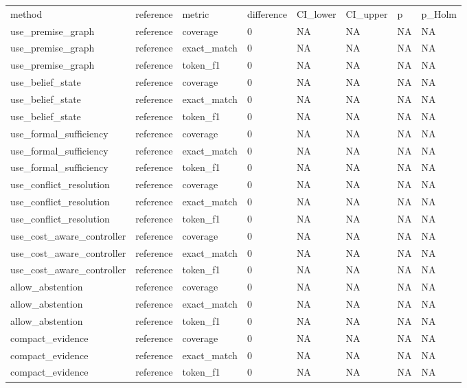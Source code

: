 \begin{tabular}{llllllll}
\hline
method & reference & metric & difference & CI\_lower & CI\_upper & p & p\_Holm \\
use\_premise\_graph & reference & coverage & 0 & NA & NA & NA & NA \\
use\_premise\_graph & reference & exact\_match & 0 & NA & NA & NA & NA \\
use\_premise\_graph & reference & token\_f1 & 0 & NA & NA & NA & NA \\
use\_belief\_state & reference & coverage & 0 & NA & NA & NA & NA \\
use\_belief\_state & reference & exact\_match & 0 & NA & NA & NA & NA \\
use\_belief\_state & reference & token\_f1 & 0 & NA & NA & NA & NA \\
use\_formal\_sufficiency & reference & coverage & 0 & NA & NA & NA & NA \\
use\_formal\_sufficiency & reference & exact\_match & 0 & NA & NA & NA & NA \\
use\_formal\_sufficiency & reference & token\_f1 & 0 & NA & NA & NA & NA \\
use\_conflict\_resolution & reference & coverage & 0 & NA & NA & NA & NA \\
use\_conflict\_resolution & reference & exact\_match & 0 & NA & NA & NA & NA \\
use\_conflict\_resolution & reference & token\_f1 & 0 & NA & NA & NA & NA \\
use\_cost\_aware\_controller & reference & coverage & 0 & NA & NA & NA & NA \\
use\_cost\_aware\_controller & reference & exact\_match & 0 & NA & NA & NA & NA \\
use\_cost\_aware\_controller & reference & token\_f1 & 0 & NA & NA & NA & NA \\
allow\_abstention & reference & coverage & 0 & NA & NA & NA & NA \\
allow\_abstention & reference & exact\_match & 0 & NA & NA & NA & NA \\
allow\_abstention & reference & token\_f1 & 0 & NA & NA & NA & NA \\
compact\_evidence & reference & coverage & 0 & NA & NA & NA & NA \\
compact\_evidence & reference & exact\_match & 0 & NA & NA & NA & NA \\
compact\_evidence & reference & token\_f1 & 0 & NA & NA & NA & NA \\
\hline
\end{tabular}
